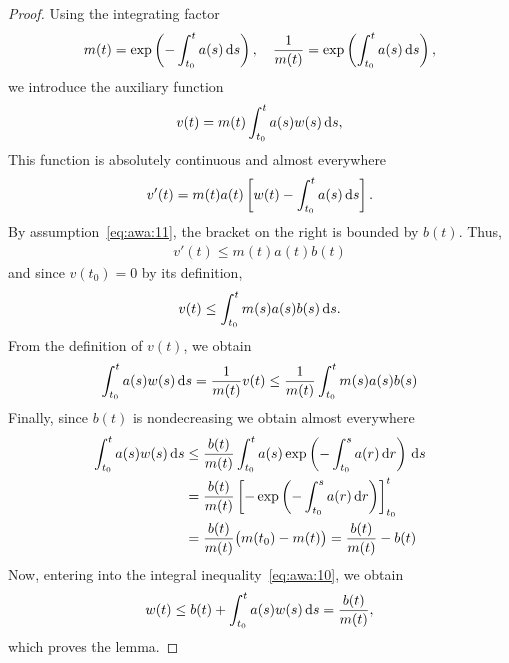 
\begin{proof}
  Using the integrating factor
  \begin{gather*}
    m(t) = \exp\left(-\int_{t_0}^t a(s) \,\mathrm{d} s\right),
    \quad
    \frac1{m(t)} = \exp\left(\int_{t_0}^t a(s) \,\mathrm{d} s\right),
  \end{gather*}
  we introduce the auxiliary function
  \begin{gather*}
    v(t) = m(t) %
    \int_{t_0}^t a(s)w(s)\ds,
  \end{gather*}
  This function is absolutely continuous and almost everywhere
  \begin{gather*}
    v'(t) = m(t) a(t) %
    \left[
      w(t) - \int_{t_0}^t a(s) \ds
    \right].
  \end{gather*}
  By assumption~\eqref{eq:awa:11}, the bracket on the right is bounded
  by $b(t)$. Thus,
  \begin{gather*}
    v'(t) \le m(t) a(t) b(t) %
  \end{gather*}
  and since $v(t_0) = 0$ by its definition,
  \begin{gather*}
    v(t) \le \int_{t_0}^t m(s) a(s) b(s) %
    \ds.
  \end{gather*}
  From the definition of $v(t)$, we obtain
  \begin{gather*}
    \int_{t_0}^t a(s)w(s)\ds = \frac1{m(t)} %
    v(t)
    \le \frac1{m(t)} \int_{t_0}^t m(s)a(s)b(s)
  \end{gather*}
  Finally, since $b(t)$ is nondecreasing we obtain almost everywhere
  \begin{align*}
    \int_{t_0}^t a(s)w(s)\,\mathrm{d} s
    &\le  \frac{b(t)}{m(t)} \int_{t_0}^t a(s)
    \exp\left(-\int_{t_0}^s a(r) \,\mathrm{d} r\right)\,\mathrm{d} s
    \\
    &= \frac{b(t)}{m(t)} \left[-
    \exp\left(-\int_{t_0}^s a(r) \,\mathrm{d} r\right)
      \right]_{t_0}^t
    \\
    &= \frac{b(t)}{m(t)} \bigl(m(t_0)-m(t)\bigr)
      = \frac{b(t)}{m(t)} - b(t)
  \end{align*}
  Now, entering into the integral inequality~\eqref{eq:awa:10}, we
  obtain
  \begin{gather*}
    w(t) \le b(t) + \int_{t_0}^t a(s)w(s)\,\mathrm{d} s = \frac{b(t)}{m(t)},
  \end{gather*}
  which proves the lemma.
\end{proof}

